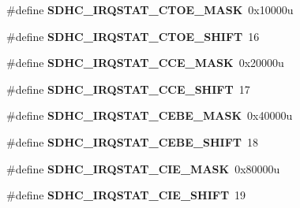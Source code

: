\begin{DoxyCompactItemize}
\item 
\hypertarget{group___s_d_h_c___register___masks_gac60476a4a3d496ff5f2527af5bbeb006}{}\#define {\bfseries S\+D\+H\+C\+\_\+\+I\+R\+Q\+S\+T\+A\+T\+\_\+\+C\+T\+O\+E\+\_\+\+M\+A\+S\+K}~0x10000u\label{group___s_d_h_c___register___masks_gac60476a4a3d496ff5f2527af5bbeb006}

\item 
\hypertarget{group___s_d_h_c___register___masks_gac22f4d05d6dd0b5bb27ac12636e46180}{}\#define {\bfseries S\+D\+H\+C\+\_\+\+I\+R\+Q\+S\+T\+A\+T\+\_\+\+C\+T\+O\+E\+\_\+\+S\+H\+I\+F\+T}~16\label{group___s_d_h_c___register___masks_gac22f4d05d6dd0b5bb27ac12636e46180}

\item 
\hypertarget{group___s_d_h_c___register___masks_ga1d6ab12c7170114b3836f7dfd0cb085a}{}\#define {\bfseries S\+D\+H\+C\+\_\+\+I\+R\+Q\+S\+T\+A\+T\+\_\+\+C\+C\+E\+\_\+\+M\+A\+S\+K}~0x20000u\label{group___s_d_h_c___register___masks_ga1d6ab12c7170114b3836f7dfd0cb085a}

\item 
\hypertarget{group___s_d_h_c___register___masks_gaf568e7274912a3580885d9852483470f}{}\#define {\bfseries S\+D\+H\+C\+\_\+\+I\+R\+Q\+S\+T\+A\+T\+\_\+\+C\+C\+E\+\_\+\+S\+H\+I\+F\+T}~17\label{group___s_d_h_c___register___masks_gaf568e7274912a3580885d9852483470f}

\item 
\hypertarget{group___s_d_h_c___register___masks_ga3176b0a0930022da225cbb55238688da}{}\#define {\bfseries S\+D\+H\+C\+\_\+\+I\+R\+Q\+S\+T\+A\+T\+\_\+\+C\+E\+B\+E\+\_\+\+M\+A\+S\+K}~0x40000u\label{group___s_d_h_c___register___masks_ga3176b0a0930022da225cbb55238688da}

\item 
\hypertarget{group___s_d_h_c___register___masks_ga0163cd5133f9fcd057aae342144534d1}{}\#define {\bfseries S\+D\+H\+C\+\_\+\+I\+R\+Q\+S\+T\+A\+T\+\_\+\+C\+E\+B\+E\+\_\+\+S\+H\+I\+F\+T}~18\label{group___s_d_h_c___register___masks_ga0163cd5133f9fcd057aae342144534d1}

\item 
\hypertarget{group___s_d_h_c___register___masks_gaee0c763af3fc323b0f3c35f3ad988e37}{}\#define {\bfseries S\+D\+H\+C\+\_\+\+I\+R\+Q\+S\+T\+A\+T\+\_\+\+C\+I\+E\+\_\+\+M\+A\+S\+K}~0x80000u\label{group___s_d_h_c___register___masks_gaee0c763af3fc323b0f3c35f3ad988e37}

\item 
\hypertarget{group___s_d_h_c___register___masks_ga485d7f9c01d7b3188cdcaaf94c556707}{}\#define {\bfseries S\+D\+H\+C\+\_\+\+I\+R\+Q\+S\+T\+A\+T\+\_\+\+C\+I\+E\+\_\+\+S\+H\+I\+F\+T}~19\label{group___s_d_h_c___register___masks_ga485d7f9c01d7b3188cdcaaf94c556707}


\end{DoxyCompactItemize}

